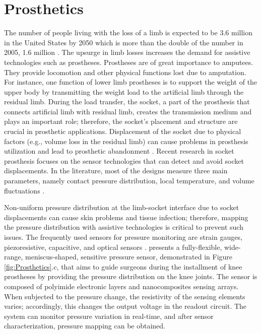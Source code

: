 \section{Prosthetics}

The number of people living with the loss of a limb is expected to be 3.6 million in the United States by 2050 which is more than the double of the number in 2005, 1.6 million \parencite{ziegler-graham_estimating_2008}. The upsurge in limb losses increases the demand for assistive technologies such as prostheses.
Prostheses are of great importance to amputees. They provide locomotion and other physical functions lost due to amputation. For instance, one function of lower limb prostheses is to support the weight of the upper body by transmitting the weight load to the artificial limb through the residual limb. During the load transfer, the socket, a part of the prosthesis that connects artificial limb with residual limb, creates the transmission medium and plays an important role; therefore, the socket's placement and structure are crucial in prosthetic applications. Displacement of the socket due to physical factors (e.g., volume loss in the residual limb) can cause problems in prosthesis utilization and lead to prosthetic abandonment \parencite{paterno_sockets_2018}. Recent research in socket prosthesis focuses on the sensor technologies that can detect and avoid socket displacements. In the literature, most of the designs measure three main parameters, namely contact pressure distribution, local temperature, and volume fluctuations \parencite{gupta_sensing_2020}. 


Non-uniform pressure distribution at the limb-socket interface due to socket displacements can cause skin problems and tissue infection; therefore, mapping the pressure distribution with assistive technologies is critical to prevent such issues. The frequently used sensors for pressure monitoring are strain gauges, piezoresistive, capacitive, and optical sensors \parencite{gupta_sensing_2020}. \textcite{sun_development_2020} presents a fully-flexible, wide-range, meniscus-shaped, sensitive pressure sensor, demonstrated in Figure \ref{fig:Prosthetics}.c, that aims to guide surgeons during the installment of knee prostheses by providing the pressure distribution on the knee joints. The sensor is composed of polyimide electronic layers and nanocomposites sensing arrays. When subjected to the pressure change, the resistivity of the sensing elements varies; accordingly, this changes the output voltage in the readout circuit. The system can monitor pressure variation in real-time, and after sensor characterization, pressure mapping can be obtained.  

